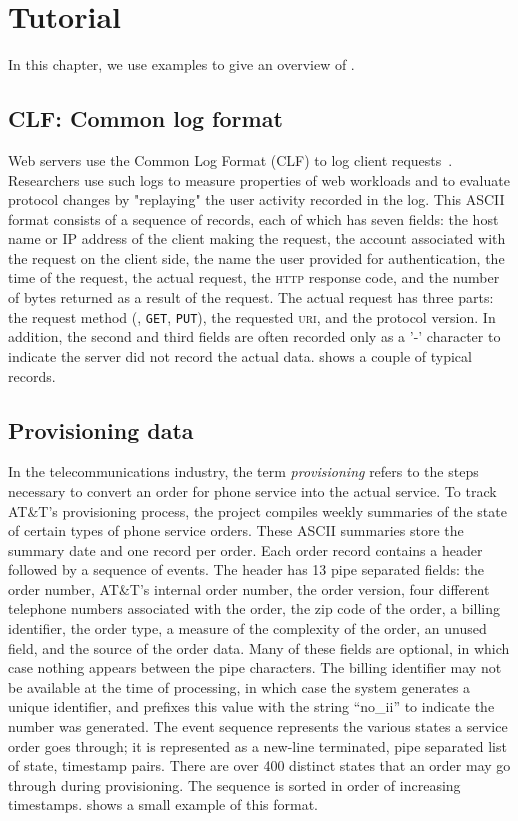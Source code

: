 \chapter{Tutorial}
\label{chap:example}
In this chapter, we use examples to give an overview of \pads{}.

\section{CLF: Common log format}
\label{sec:example:common-log-format}
Web servers use the Common Log Format (CLF) to log client
requests~\cite{wpp}.  Researchers use such logs to measure
properties of web workloads and to evaluate protocol changes
by "replaying" the user activity recorded in the log.
This ASCII format consists of a sequence of
records, each of which has seven fields: the host name or IP address
of the client making the request, the account associated with the
request on the client side, the name the user provided for
authentication, the time of the request, the actual request, the
\textsc{http} response code, and the number of bytes returned as a
result of the request.  The actual request has three parts: the
request method (\eg, \texttt{GET}, \texttt{PUT}), the requested
\textsc{uri}, and the protocol version.  In addition, the second and
third fields are often recorded only as a '-' character to indicate
the server did not record the actual data.  
shows a couple of typical records.

\section{Provisioning data}

In the telecommunications industry, the term \textit{provisioning}
refers to the steps necessary to convert an order for phone service
into the actual service.  To track AT\&T's provisioning process, the
\dibbler{} project compiles weekly summaries of the state of certain
types of phone service orders.  These ASCII summaries store the
summary date and one record per order.  Each order record contains a
header followed by a sequence of events.  The header has 13 pipe
separated fields: the order number, AT\&T's internal order number, the
order version, four different telephone numbers associated with the
order, the zip code of the order, a billing identifier, the order
type, a measure of the complexity of the order, an unused field, and
the source of the order data.  Many of these fields are optional, in
which case nothing appears between the pipe characters.  The billing
identifier may not be available at the time of processing, in which
case the system generates a unique identifier, and prefixes this value
with the string ``no\_ii'' to indicate the number was generated. The
event sequence represents the various states a service order goes
through; it is represented as a new-line terminated, pipe separated
list of state, timestamp pairs.  There are over 400 distinct states
that an order may go through during provisioning.  The sequence is
sorted in order of increasing
timestamps.  shows a small example of
this format.


